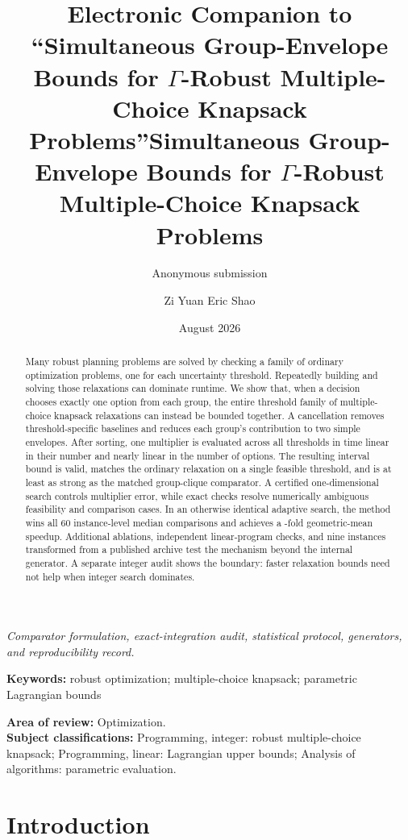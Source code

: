 \documentclass[11pt]{article}
\title{Electronic Companion to ``Simultaneous Group-Envelope Bounds for $\Gamma$-Robust Multiple-Choice Knapsack Problems''}
\title{Simultaneous Group-Envelope Bounds for $\Gamma$-Robust Multiple-Choice Knapsack Problems}
\author{Anonymous submission}
\affil{}
\author{Zi Yuan Eric Shao}
\affil{Department of Mathematics, ETH Z\"urich, \texttt{ershao@student.ethz.ch}}
\date{}
\date{August 2026}
\theoremstyle{plain}
\theoremstyle{definition}
\theoremstyle{remark}
\newcommand{\keywords}[1]{\par\medskip\noindent\textbf{Keywords:} #1}
\begin{document}
\maketitle

\ifcompanion
\begin{center}
\emph{Comparator formulation, exact-integration audit, statistical protocol, generators, and reproducibility record.}
\end{center}
\else

\begin{abstract}
Many robust planning problems are solved by checking a family of ordinary optimization problems, one for each uncertainty threshold.  Repeatedly building and solving those relaxations can dominate runtime.  We show that, when a decision chooses exactly one option from each group, the entire threshold family of multiple-choice knapsack relaxations can instead be bounded together.  A cancellation removes threshold-specific baselines and reduces each group's contribution to two simple envelopes.  After sorting, one multiplier is evaluated across all thresholds in time linear in their number and nearly linear in the number of options.  The resulting interval bound is valid, matches the ordinary relaxation on a single feasible threshold, and is at least as strong as the matched group-clique comparator.  A certified one-dimensional search controls multiplier error, while exact checks resolve numerically ambiguous feasibility and comparison cases.  In an otherwise identical adaptive search, the method wins all 60 instance-level median comparisons and achieves a \PubPrimaryGeoSpeedup-fold geometric-mean speedup.  Additional ablations, independent linear-program checks, and nine instances transformed from a published archive test the mechanism beyond the internal generator.  A separate integer audit shows the boundary: faster relaxation bounds need not help when integer search dominates.
\end{abstract}

\keywords{robust optimization; multiple-choice knapsack; parametric Lagrangian bounds}

\noindent\textbf{Area of review:} Optimization.\\
\textbf{Subject classifications:} Programming, integer: robust multiple-choice knapsack; Programming, linear: Lagrangian upper bounds; Analysis of algorithms: parametric evaluation.

\section{Introduction}\label{sec:introduction}
\end{document}

